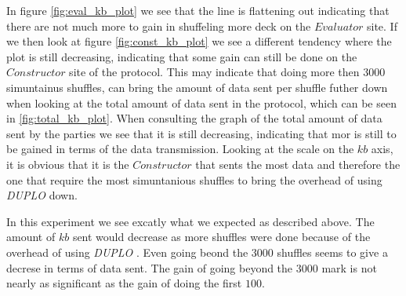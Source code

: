 \documentclass[twoside,11pt,openright]{report}
\newcommand{\DUPLO}{\textit{DUPLO} }
\begin{document}
In figure \ref{fig:eval_kb_plot} we see that the line is flattening out indicating that there are not much more to gain in shuffeling more deck on the $Evaluator$ site. If we then look at figure \ref{fig:const_kb_plot} we see a different tendency where the plot is still decreasing, indicating that some gain can still be done on the $Constructor$ site of the protocol. This may indicate that doing more then $3000$ simuntainus shuffles, can bring the amount of data sent per shuffle futher down when looking at the total amount of data sent in the protocol, which can be seen in \ref{fig:total_kb_plot}. When consulting the graph of the total amount of data sent by the parties we see that it is still decreasing, indicating that mor is still to be gained in terms of the data transmission. Looking at the scale on the $kb$ axis, it is obvious that it is the $Constructor$ that sents the most data and therefore the one that require the most simuntanious shuffles to bring the overhead of using \DUPLO down.

\bigskip

In this experiment we see excatly what we expected as described above. The amount of $kb$ sent would decrease as more shuffles were done because of the overhead of using \DUPLO. Even going beond the $3000$ shuffles seems to give a decrese in terms of data sent. The gain of going beyond the $3000$ mark is not nearly as significant as the gain of doing the first $100$.

\bigskip
\end{document}
